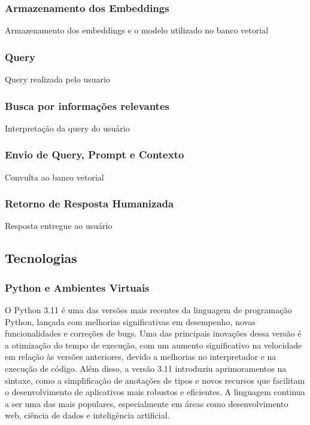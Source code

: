 \documentclass[a4paper, 12pt]{article}
\begin{document}
    \subsubsection{Armazenamento dos Embeddings}
    Armazenamento dos embeddings e o modelo utilizado no banco vetorial

    \subsubsection{Query}
    Query realizada pelo usuario

    \subsubsection{Busca por informações relevantes}
    Interpretação da query do usuário

    \subsubsection{Envio de Query, Prompt e Contexto}
    Convulta ao banco vetorial

    \subsubsection{Retorno de Resposta Humanizada}
    Resposta entregue ao usuário

    \subsection{Tecnologias}

    \subsubsection{Python e Ambientes Virtuais}
    
    O Python 3.11 é uma das versões mais recentes da linguagem de programação Python, lançada com melhorias significativas em desempenho, novas funcionalidades e correções de bugs. Uma das principais inovações dessa versão é a otimização do tempo de execução, com um aumento significativo na velocidade em relação às versões anteriores, devido a melhorias no interpretador e na execução de código. Além disso, a versão 3.11 introduziu aprimoramentos na sintaxe, como a simplificação de anotações de tipos e novos recursos que facilitam o desenvolvimento de aplicativos mais robustos e eficientes. A linguagem continua a ser uma das mais populares, especialmente em áreas como desenvolvimento web, ciência de dados e inteligência artificial.
    
\end{document}
